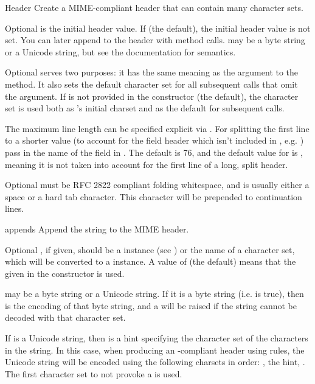 \begin{classdesc}{Header}{}
Create a MIME-compliant header that can contain many character sets.

Optional  is the initial header value.  If  (the
default), the initial header value is not set.  You can later append
to the header with  method calls.   may be a
byte string or a Unicode string, but see the 
documentation for semantics.

Optional  serves two purposes: it has the same meaning as
the  argument to the  method.  It also
sets the default character set for all subsequent 
calls that omit the  argument.  If  is not
provided in the constructor (the default), the 
character set is used both as 's initial charset and as the
default for subsequent  calls.

The maximum line length can be specified explicit via
.  For splitting the first line to a shorter value (to
account for the field header which isn't included in ,
e.g. ) pass in the name of the field in
.  The default  is 76, and the
default value for  is , meaning it is not
taken into account for the first line of a long, split header.

Optional  must be RFC 2822 compliant folding
whitespace, and is usually either a space or a hard tab character.
This character will be prepended to continuation lines.
\end{classdesc}

\begin{methoddesc}[Header]{append}{s}
Append the string  to the MIME header.

Optional , if given, should be a  instance
(see ) or the name of a character set, which
will be converted to a  instance.  A value of
 (the default) means that the  given in the
constructor is used.

 may be a byte string or a Unicode string.  If it is a byte
string (i.e.  is true), then
 is the encoding of that byte string, and a
 will be raised if the string cannot be
decoded with that character set.

If  is a Unicode string, then  is a hint
specifying the character set of the characters in the string.  In this
case, when producing an -compliant header using 
rules, the Unicode string will be encoded using the following charsets
in order: , the  hint, .  The
first character set to not provoke a  is used.
\end{methoddesc}

